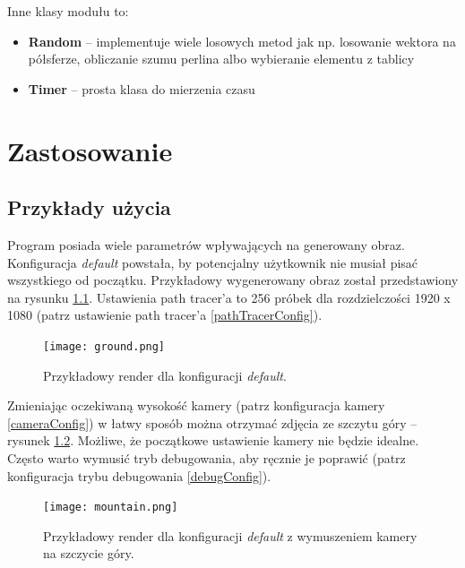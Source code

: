 \documentclass[inz,shortabstract]{iithesis}
\begin{document}
            Inne klasy modułu to:
            \begin{itemize}
                \item \textbf{Random} -- implementuje wiele losowych metod jak np. losowanie wektora na półsferze, obliczanie szumu perlina albo wybieranie elementu z tablicy
                \item \textbf{Timer} -- prosta klasa do mierzenia czasu  
            \end{itemize}
            
\chapter{Zastosowanie}
    \section{Przykłady użycia}
        Program posiada wiele parametrów wpływających na generowany obraz. Konfiguracja \textit{default} powstała, by potencjalny użytkownik nie musiał pisać wszystkiego od początku. Przykładowy wygenerowany obraz został przedstawiony na rysunku \ref{fig:ground}. Ustawienia path tracer'a to 256 próbek dla rozdzielczości 1920 x 1080 (patrz ustawienie path tracer'a \ref{pathTracerConfig}).
        \begin{figure}[h]
            \texttt{[image: ground.png]}
            \caption{Przykładowy render dla konfiguracji \textit{default}.} 
            \label{fig:ground}
        \end{figure}
        
        Zmieniając oczekiwaną wysokość kamery (patrz konfiguracja kamery \ref{cameraConfig}) w łatwy sposób można otrzymać zdjęcia ze szczytu góry -- rysunek \ref{fig:mountain}. Możliwe, że początkowe ustawienie kamery nie będzie idealne. Często warto wymusić tryb debugowania, aby ręcznie je poprawić (patrz konfiguracja trybu debugowania \ref{debugConfig}). 
        \begin{figure}[h]
            \texttt{[image: mountain.png]}
            \caption{Przykładowy render dla konfiguracji \textit{default} z wymuszeniem kamery na szczycie góry.} 
            \label{fig:mountain}
        \end{figure}
        
\end{document}
